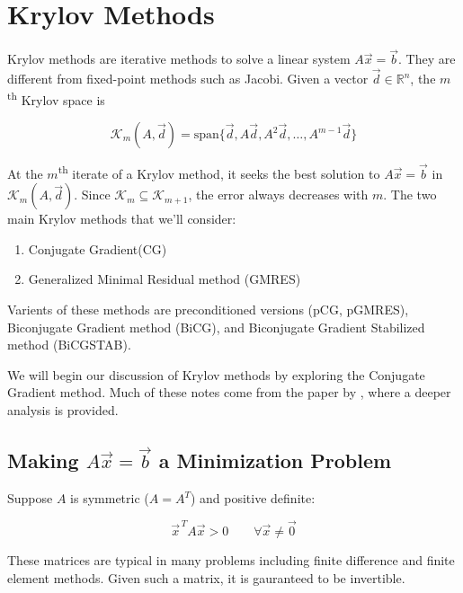 
\section{Krylov Methods}

Krylov methods are iterative methods to solve a linear system $A\vec{x}=\vec{b}$. They are different from fixed-point methods such as Jacobi. Given a vector $\vec{d}\in \mathbb{R}^n$, the $m$\textsuperscript{th} Krylov space is

\begin{equation*}
    \mathcal{K}_m (A, \vec{d}) = \text{span}\{ \vec{d}, A\vec{d}, A^2 \vec{d}, \ldots, A^{m-1}\vec{d}\}
\end{equation*}

At the $m$\textsuperscript{th} iterate of a Krylov method, it seeks the best solution to $A\vec{x}=\vec{b}$ in $\mathcal{K}_m(A, \vec{d})$. Since $\mathcal{K}_m \subseteq \mathcal{K}_{m+1}$, the error always decreases with $m$. The two main Krylov methods that we'll consider:

\begin{enumerate}[1)]
    \item Conjugate Gradient(CG)
    \item Generalized Minimal Residual method (GMRES)
\end{enumerate}

Varients of these methods are preconditioned versions (pCG, pGMRES), Biconjugate Gradient method (BiCG), and Biconjugate Gradient Stabilized method (BiCGSTAB).

We will begin our discussion of Krylov methods by exploring the Conjugate Gradient method. Much of these notes come from the paper by \cite{shewchuk-1994} , where a deeper analysis is provided.

\subsection*{Making $A\vec{x}=\vec{b}$ a Minimization Problem}

Suppose $A$ is symmetric ($A=A^T$) and positive definite:

\begin{equation*}
    \vec{x}^{\,T}A\vec{x} > 0 \qquad \forall \vec{x}\neq\vec{0}
\end{equation*}

These matrices are typical in many problems including finite difference and finite element methods. Given such a matrix, it is gauranteed to be invertible.

